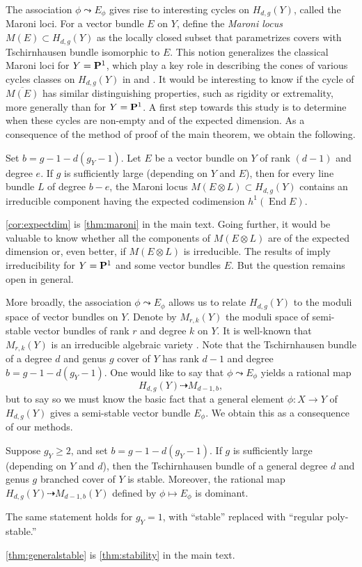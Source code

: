 \documentclass[11 pt]{amsart}
\renewcommand {\P}{{\bf P}}
\providecommand {\from}{{\colon}}
\providecommand{\End}{\operatorname{End}}
\numberwithin{equation}{section}
\begin{document}
The association $\phi \leadsto E_\phi$ gives rise to interesting cycles on $H_{d,g}(Y)$, called the Maroni loci.
For a vector bundle $E$ on $Y$, define the \emph{Maroni locus} $M(E) \subset H_{d,g}(Y)$ as the locally closed subset that parametrizes covers with Tschirnhausen bundle isomorphic to $E$.
This notion generalizes the classical Maroni loci for $Y = \P^1$, which play a key role in describing the cones of various cycles classes on $H_{d,g}(Y)$ in \cite{deo.pat:13} and \cite{pat:15}.
It would be interesting to know if the cycle of $\overline{M(E)}$ has similar distinguishing properties, such as rigidity or extremality, more generally than for $Y = \P^1$.
A first step towards this study is to determine when these cycles are non-empty and of the expected dimension.
As a consequence of the method of proof of the main theorem, we obtain the following.
\begin{theorem}\label{cor:expectdim}
  Set $b = g-1-d(g_Y-1)$.
  Let $E$ be a vector bundle on $Y$ of rank $(d-1)$ and degree $e$.
  If $g$ is sufficiently large (depending on $Y$ and $E$), then for every line bundle $L$ of degree $b-e$, the Maroni locus $M(E \otimes L) \subset H_{d,g}(Y)$ contains an irreducible component having the expected codimension $h^{1}(\End E)$.
\end{theorem}
\autoref{cor:expectdim} is \autoref{thm:maroni} in the main text.
Going further, it would be valuable to know whether all the components of $M(E \otimes L)$ are of the expected dimension or, even better, if $M(E \otimes L)$ is irreducible.
The results of \cite[\S~2]{deo.pat:15} imply irreducibility for $Y = \P^1$ and some vector bundles $E$.
But the question remains open in general.


More broadly, the association $\phi \leadsto E_\phi$ allows us to relate $H_{d,g}(Y)$ to the moduli space of vector bundles on $Y$.
Denote by $M_{r,k}(Y)$ the moduli space of semi-stable vector bundles of rank $r$ and degree $k$ on $Y$.
It is well-known that $M_{r,k}(Y)$ is an irreducible algebraic variety \cite{ses:82}.
Note that the Tschirnhausen bundle of a degree $d$ and genus $g$ cover of $Y$ has rank $d-1$ and degree $b = g-1-d(g_Y-1)$.
One would like to say that $\phi \leadsto E_\phi$ yields a rational map
\[ H_{d,g}(Y) \dashrightarrow M_{d-1,b},\]
but to say so we must know the basic fact that a general element $\phi \from X \to Y$ of $H_{d,g}(Y)$ gives a semi-stable vector bundle $E_\phi$.
We obtain this as a consequence of our methods.
\begin{theorem}
  \label{thm:generalstable}
  Suppose $g_{Y} \geq 2$, and set $b = g-1-d(g_Y-1)$.
  If $g$ is sufficiently large (depending on $Y$ and $d$), then the Tschirnhausen bundle of a general degree $d$ and genus $g$ branched cover of $Y$ is stable.
  Moreover, the rational map $H_{d,g}(Y) \dashrightarrow M_{d-1,b}(Y)$ defined by $\phi \mapsto E_\phi$ is dominant. 

  The same statement holds for $g_{Y} = 1$, with ``stable'' replaced with ``regular poly-stable.''
\end{theorem}
\autoref{thm:generalstable} is \autoref{thm:stability} in the main text.
\end{document}
